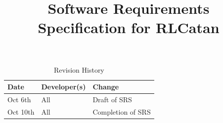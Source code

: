 \documentclass{article}
\title{Software Requirements Specification for RLCatan\\\progname}
\author{\authname}
\date{}
\begin{document}
\maketitle

\tableofcontents

\listoftables

\listoffigures

\newpage

\begin{table}[hp]
\caption{Revision History} \label{TblRevisionHistory}
\begin{tabularx}{\textwidth}{llX}
\toprule
\textbf{Date} & \textbf{Developer(s)} & \textbf{Change}\\
\midrule
Oct 6th & All & Draft of SRS\\
Oct 10th & All & Completion of SRS\\
\bottomrule
\end{tabularx}
\end{table}
\end{document}
